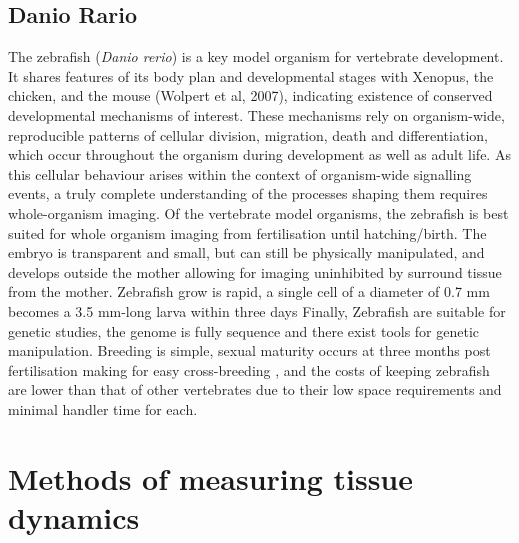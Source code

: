 \subsection{Danio Rario}
The zebrafish (\emph{Danio rerio}) is a key model organism for vertebrate development.
It shares features of its body plan and developmental stages with Xenopus, the chicken, and the mouse (Wolpert et al, 2007), indicating existence of conserved developmental mechanisms of interest.
These mechanisms rely on organism-wide, reproducible patterns of cellular division, migration, death and differentiation, which occur throughout the organism during development as well as adult life.
As this cellular behaviour arises within the context of organism-wide signalling events, a truly complete understanding of the processes shaping them requires whole-organism imaging.
Of the vertebrate model organisms, the zebrafish is best suited for whole organism imaging from fertilisation until hatching/birth.
The embryo is transparent and small, but can still be physically manipulated, and develops outside the mother allowing for imaging uninhibited by surround tissue from the mother.
Zebrafish grow is rapid, a single cell of a diameter of 0.7 mm becomes a 3.5 mm-long larva within three days %
Finally, Zebrafish are suitable for genetic studies, the genome is fully sequence and there exist tools for genetic manipulation.
Breeding is simple, sexual maturity occurs at three months post fertilisation making for easy cross-breeding %
, and the costs of keeping zebrafish are lower than that of other vertebrates due to their low space requirements and minimal handler time for each. %

\section{Methods of measuring tissue dynamics}

